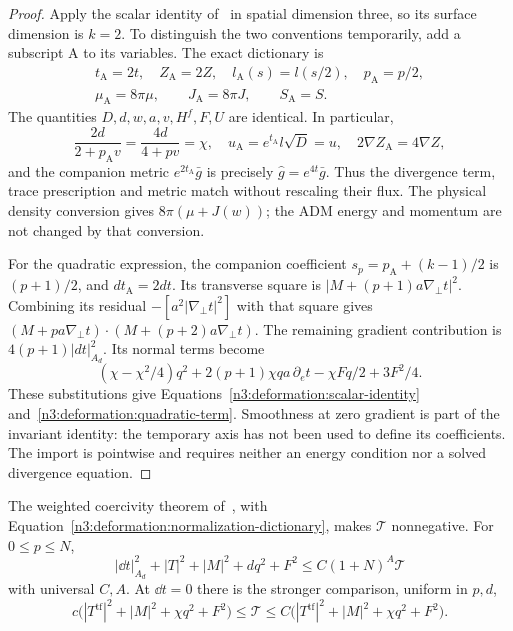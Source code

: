 \begin{proof}
Apply the scalar identity of~\cite[Proposition~4.1]{NumericalCompanion} in spatial
dimension three, so its surface dimension is $k=2$. To distinguish
the two conventions temporarily, add a subscript $\mathrm A$ to its
variables. The exact dictionary is
\begin{equation}\label{n3:deformation:normalization-dictionary}
 \begin{gathered}
 t_{\mathrm A}=2t,\quad Z_{\mathrm A}=2Z,\quad
 l_{\mathrm A}(s)=l(s/2),\quad p_{\mathrm A}=p/2,\\
 \mu_{\mathrm A}=8\pi\mu,\qquad J_{\mathrm A}=8\pi J,
 \qquad S_{\mathrm A}=S.
 \end{gathered}
\end{equation}
The quantities $D,d,w,a,v,H^f,F,U$ are identical. In particular,
\[
 \frac{2d}{2+p_{\mathrm A}v}=\frac{4d}{4+pv}=\chi,
 \quad u_{\mathrm A}=e^{t_{\mathrm A}}l\sqrt D=u,
 \quad 2\nabla Z_{\mathrm A}=4\nabla Z,
\]
and the companion metric $e^{2t_{\mathrm A}}\bar g$ is precisely
$\hat g=e^{4t}\bar g$. Thus the divergence term, trace prescription
and metric match without rescaling their flux. The physical density
conversion gives $8\pi(\mu+J(w))$; the ADM energy and momentum are
not changed by that conversion.

For the quadratic expression, the companion coefficient
$s_p=p_{\mathrm A}+(k-1)/2$ is $(p+1)/2$, and
$dt_{\mathrm A}=2dt$. Its transverse square is
$|M+(p+1)a\nabla_\perp t|^2$. Combining its residual
$-[a^2|\nabla_\perp t|^2]$ with that square gives
$(M+pa\nabla_\perp t)\cdot(M+(p+2)a\nabla_\perp t)$.
The remaining gradient contribution is
$4(p+1)|dt|_{A_d}^2$. Its normal terms become
\[
 (\chi-\chi^2/4)q^2+2(p+1)\chi qa\,\partial_e t
       -\chi Fq/2+3F^2/4.
\]
These substitutions give Equations~\eqref{n3:deformation:scalar-identity}
and~\eqref{n3:deformation:quadratic-term}. Smoothness at zero gradient
is part of the invariant identity: the temporary axis has not been
used to define its coefficients. The import is pointwise and
requires neither an energy condition nor a solved divergence equation.
\end{proof}

\begin{lemma}\label{n3:deformation:coercivity}
The weighted coercivity theorem of~\cite[Proposition~4.2]{NumericalCompanion}, with
Equation~\eqref{n3:deformation:normalization-dictionary}, makes
$\mathcal T$ nonnegative. For $0\le p\le N$,
\begin{equation}\label{n3:deformation:coercive-estimate}
 |\dd t|_{A_d}^2+|T|^2+|M|^2+dq^2+F^2
 \le C(1+N)^A\mathcal T
\end{equation}
with universal $C,A$.
At $\dd t=0$ there is the stronger comparison, uniform in $p,d$,
\begin{equation}\label{n3:deformation:floor-norm}
 c\bigl(|T^{\operatorname{tf}}|^2+|M|^2+\chi q^2+F^2\bigr)
 \le\mathcal T
 \le C\bigl(|T^{\operatorname{tf}}|^2+|M|^2+\chi q^2+F^2\bigr).
\end{equation}
\end{lemma}

